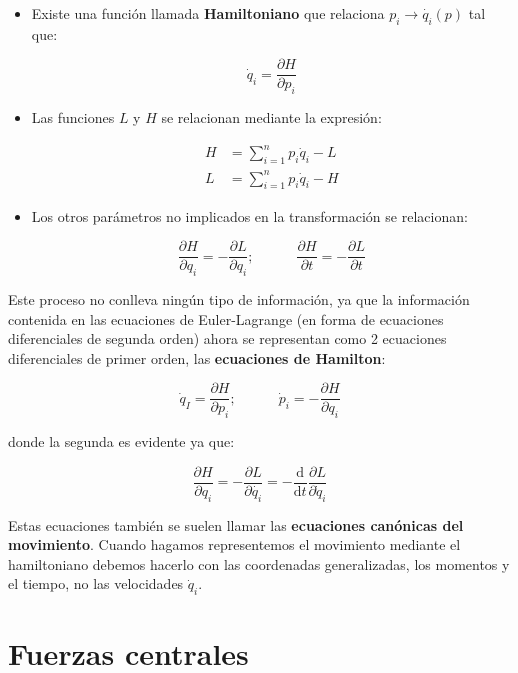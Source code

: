 \documentclass[12pt,a4paper]{book}
\newcommand{\parciales}[2]{\frac{\partial #1}{\partial #2}}
\newcommand{\D}{\mathrm{d}}
\newcommand{\tquad}{\quad \quad \quad}
\begin{document}
\begin{itemize}
\item Existe una función llamada \textbf{Hamiltoniano} que relaciona $p_i \rightarrow \dot{q_i} (p)$ tal que:

\begin{equation}
\dot{q}_i = \parciales{H}{p_i}
\end{equation}

\item Las funciones $L$ y $H$ se relacionan mediante la expresión:

\begin{align}
H & = \sum_{i=1}^n  p_i \dot{q}_i - L \\
L & = \sum_{i=1}^n  p_i \dot{q}_i - H
\end{align}

\item Los otros parámetros no implicados en la transformación se relacionan:

\begin{equation}
\parciales{H}{q_i} =  - \parciales{L}{q_i}; \tquad \parciales{H}{t} =  - \parciales{L}{t}
\end{equation}
\end{itemize}

Este proceso no conlleva ningún tipo de información, ya que la información contenida en las ecuaciones de Euler-Lagrange (en forma de ecuaciones diferenciales de segunda orden) ahora se representan como 2 ecuaciones diferenciales de primer orden, las \textbf{ecuaciones de Hamilton}:

\begin{equation}
\dot{q}_I = \parciales{H}{p_i}; \tquad \dot{p}_i = - \parciales{H}{q_i}
\end{equation}

donde la segunda es evidente ya que:

$$ \parciales{H}{q_i} = - \parciales{L}{\dot{q_i}} = - \dfrac{\D}{\D t} \parciales{L}{\dot{q}_i} $$

Estas ecuaciones también se suelen llamar las \textbf{ecuaciones canónicas del movimiento}. Cuando hagamos representemos el movimiento mediante el hamiltoniano debemos hacerlo con las coordenadas generalizadas, los momentos y el tiempo, no las velocidades $\dot{q}_i$.




\chapter{Fuerzas centrales}
\end{document}
